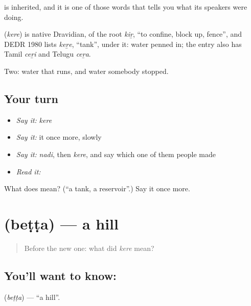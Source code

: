 is inherited, and it is one of those words that tells you what its speakers were doing.

\begin{cousinweb}
\textbf{} (\emph{kere}) is native Dravidian, of the root \emph{kiṟ}, \textquotedblleft{}to confine, block up, fence\textquotedblright{}, and DEDR 1980 lists \emph{keṟe}, \textquotedblleft{}tank\textquotedblright{}, under it: water penned in; the entry also has Tamil \emph{ceṟi} and Telugu \emph{ceṟa}.
\end{cousinweb}

\begin{grammarlens}[title={What you've built}]
Two: water that runs, and water somebody stopped.
\end{grammarlens}

\subsection*{Your turn}
\begin{itemize}
\raggedright
  \item \emph{Say it:} \emph{kere}
  \item \emph{Say it:} it once more, slowly
  \item \emph{Say it:} \emph{nadi}, then \emph{kere}, and say which one of them people made
  \item \emph{Read it:} \textbf{}
\end{itemize}

\begin{tcolorbox}[breakable,colback=teal!4,colframe=teal!35!black,title={Before you move on}]
What does  mean? (\textquotedblleft{}a tank, a reservoir\textquotedblright{}.) Say it once more.
\end{tcolorbox}
\section[\texorpdfstring{\kn{ಬೆಟ್ಟ} (beṭṭa)}{ಬೆಟ್ಟ (beṭṭa)}]{ (beṭṭa) — a hill}

\label{lesson:KA-C55-hill}



\begin{quote}
Before the new one: what did \emph{kere} mean?
\end{quote}

\subsection*{You'll want to know: }
\textbf{} (\emph{beṭṭa}) — \textquotedblleft{}a hill\textquotedblright{}.

